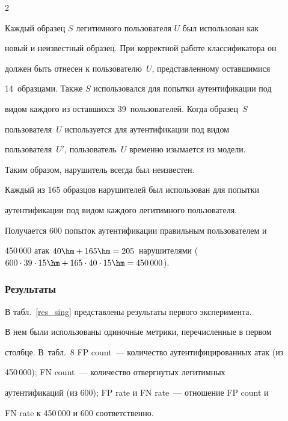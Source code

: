 \begin{multicols}{2}



Каждый образец $S$ легитимного пользователя $U$ был использован как

новый и неизвестный образец. При корректной работе классификатора он

должен быть отнесен к пользователю~$U$, представленному оставшимися

14~образцами. Также $S$ использовался для попытки аутентификации под

видом каждого из оставшихся 39~пользователей. Когда образец~$S$

пользователя~$U$ используется для аутентификации под видом

пользователя~$U'$, пользователь~$U$ временно изымается из модели.

Таким образом, нарушитель всегда был неизвестен.



Каждый из 165 образцов нарушителей был использован для попытки

аутентификации под видом каждого легитимного пользователя.

Получается 600 попыток аутентификации правильным пользователем и

450\,000 атак $40 \hm+ 165 \hm= 205$~нарушителями ($600   \hm+

165   \hm= 450\,000$).



\subsubsection {Результаты}



В табл.~\ref{res_sing} представлены результаты первого эксперимента.

В нем были использованы одиночные метрики, перечисленные в первом

столбце. В~табл.~8 FP count~--- количество аутентифицированных атак (из

450\,000); FN count~--- количество отвергнутых легитимных

аутентификаций (из 600); FP rate и FN rate~--- отношение FP count и

FN rate к 450\,000 и 600 соответственно.




\end{multicols}

